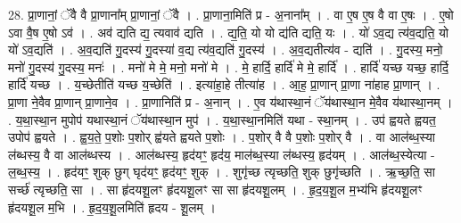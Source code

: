 \documentclass[17pt]{extarticle}
\begin{document}
28. प्रा॒णानां॒ ॅवै वै प्रा॒णाना᳚म् प्रा॒णानां॒ ॅवै । . प्रा॒णाना॒मिति॑ प्र - अ॒नाना᳚म् । . वा ए॒ष ए॒ष वै वा ए॒षः । . ए॒षो ऽवा वै॒ष ए॒षो ऽव॑ । . अव॑ द्यति द्य॒ त्यवाव॑ द्यति । . द्य॒ति॒ यो यो द्य॑ति द्यति॒ यः । . यो॑ ऽव॒द्य त्य॑व॒द्यति॒ यो यो॑ ऽव॒द्यति॑ । . अ॒व॒द्यति॑ गु॒दस्य॑ गु॒दस्या॑ व॒द्य त्य॑व॒द्यति॑ गु॒दस्य॑ । . अ॒व॒द्यतीत्य॑व - द्यति॑ । . गु॒दस्य॒ मनो॒ मनो॑ गु॒दस्य॑ गु॒दस्य॒ मनः॑ । . मनो॑ मे मे॒ मनो॒ मनो॑ मे । . मे॒ हार्दि॒ हार्दि॑ मे मे॒ हार्दि॑ । . हार्दि॑ यच्छ यच्छ॒ हार्दि॒ हार्दि॑ यच्छ । . य॒च्छेतीति॑ यच्छ य॒च्छेति॑ । . इत्या॑हा॒हे तीत्या॑ह । . आ॒ह॒ प्रा॒णान् प्रा॒णा ना॑हाह प्रा॒णान् । . प्रा॒णा ने॒वैव प्रा॒णान् प्रा॒णाने॒व । . प्रा॒णानिति॑ प्र - अ॒नान् । . ए॒व य॑थास्था॒नं ॅय॑थास्था॒न मे॒वैव य॑थास्था॒नम् । . य॒था॒स्था॒न मुपोप॑ यथास्था॒नं ॅय॑थास्था॒न मुप॑ । . य॒था॒स्था॒नमिति॑ यथा - स्था॒नम् । . उप॑ ह्वयते ह्वयत॒ उपोप॑ ह्वयते । . ह्व॒य॒ते॒ प॒शोः प॒शोर् ह्व॑यते ह्वयते प॒शोः । . प॒शोर् वै वै प॒शोः प॒शोर् वै । . वा आल॑ब्ध॒स्या ल॑ब्धस्य॒ वै वा आल॑ब्धस्य । . आल॑ब्धस्य॒ हृद॑यꣳ॒॒ हृद॑य॒ माल॑ब्ध॒स्या ल॑ब्धस्य॒ हृद॑यम् । . आल॑ब्ध॒स्येत्या - ल॒ब्ध॒स्य॒ । . हृद॑यꣳ॒॒ शुक् छुग् घृद॑यꣳ॒॒ हृद॑यꣳ॒॒ शुक् । . शुगृ॑च्छ त्यृच्छति॒ शुक् छुगृ॑च्छति । . ऋ॒च्छ॒ति॒ सा सर्च्छ॑ त्यृच्छति॒ सा । . सा हृ॑दयशू॒लꣳ हृ॑दयशू॒लꣳ सा सा हृ॑दयशू॒लम् । . हृ॒द॒य॒शू॒ल म॒भ्य॑भि हृ॑दयशू॒लꣳ हृ॑दयशू॒ल म॒भि । . हृ॒द॒य॒शू॒लमिति॑ हृदय - शू॒लम् । \newline
\end{document}
